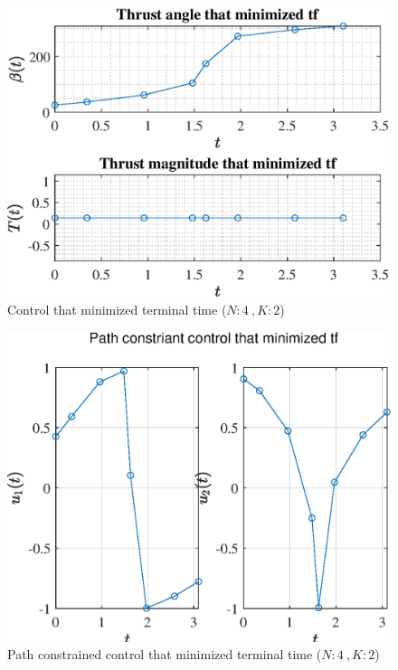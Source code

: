 \documentclass[]{article}
\begin{document}
	\begin{figure}
		\centering
		\includegraphics[scale=0.75]{control_N4_K2_C3_tf.eps}
		\caption{Control that minimized terminal time (\(N:4\ , K:2\))}
		\label{fig:control_N4_K2_C3_tf}
	\end{figure}
	\begin{figure}
		\centering
		\includegraphics[scale=0.75]{path_N4_K2_C3_tf.eps}
		\caption{Path constrained control that minimized terminal time (\(N:4\ , K:2\))}
		\label{fig:path_N4_K2_C3_tf}
	\end{figure}
\end{document}
